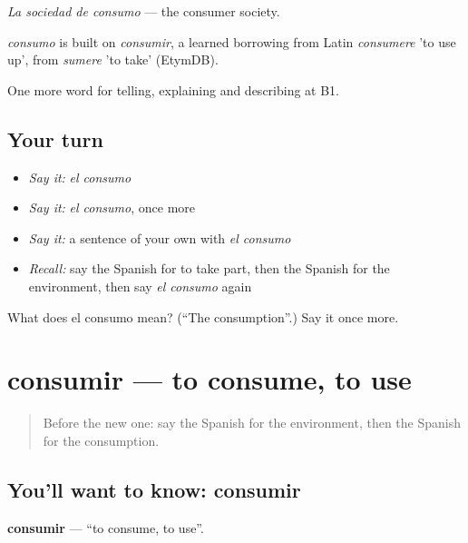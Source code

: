 \emph{La sociedad de consumo} — the consumer society.

\begin{cousinweb}
\emph{consumo} is built on \emph{consumir}, a learned borrowing from Latin \emph{consumere} 'to use up', from \emph{sumere} 'to take' (EtymDB).
\end{cousinweb}

\begin{grammarlens}[title={What you've built}]
One more word for telling, explaining and describing at B1.
\end{grammarlens}

\subsection*{Your turn}
\begin{itemize}
\raggedright
  \item \emph{Say it:} \emph{el consumo}
  \item \emph{Say it:} \emph{el consumo}, once more
  \item \emph{Say it:} a sentence of your own with \emph{el consumo}
  \item \emph{Recall:} say the Spanish for to take part, then the Spanish for the environment, then say \emph{el consumo} again
\end{itemize}

\begin{tcolorbox}[breakable,colback=teal!4,colframe=teal!35!black,title={Before you move on}]
What does el consumo mean? (\textquotedblleft{}The consumption\textquotedblright{}.) Say it once more.
\end{tcolorbox}
\section[consumir]{consumir — to consume, to use}

\label{lesson:ES-C607-consumir}



\begin{quote}
Before the new one: say the Spanish for the environment, then the Spanish for the consumption.
\end{quote}

\subsection*{You'll want to know: consumir}
\textbf{consumir} — \textquotedblleft{}to consume, to use\textquotedblright{}.

